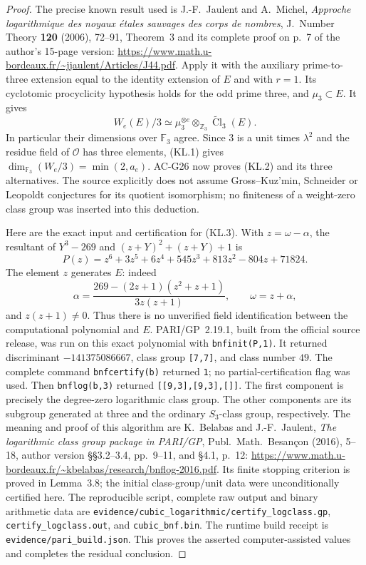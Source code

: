 \begin{proof}
The precise known result used is J.-F.~Jaulent and A.~Michel,
\emph{Approche logarithmique des noyaux \'etales sauvages des corps
 de nombres}, J.~Number Theory \textbf{120} (2006), 72--91,
Theorem~3 and its complete proof on p.~7 of the author's 15-page
version:
\url{https://www.math.u-bordeaux.fr/~jjaulent/Articles/J44.pdf}.
Apply it with the auxiliary prime-to-three extension equal to the
identity extension of $E$ and with $r=1$.  Its cyclotomic
procyclicity hypothesis holds for the odd prime three, and
$\mu_3\subset E$.  It gives
\[
 W_e(E)/3\simeq\mu_3^{\otimes e}\otimes_{\mathbb Z_3}
                   \widetilde{\operatorname{Cl}}_3(E). \tag{KL.4}
\]
In particular their dimensions over $\mathbb F_3$ agree.
Since $3$ is a unit times $\lambda^2$ and the residue field of
$\mathcal O$ has three elements, (KL.1) gives
$\dim_{\mathbb F_3}(W_e/3)=\min(2,a_e)$.  AC-G26 now proves
(KL.2) and its three alternatives.  The source explicitly does
not assume Gross--Kuz'min, Schneider or Leopoldt conjectures
for its quotient isomorphism; no finiteness of a weight-zero
class group was inserted into this deduction.

Here are the exact input and certification for (KL.3).  With
$z=\omega-\alpha$, the resultant of
$Y^3-269$ and $(z+Y)^2+(z+Y)+1$ is
\[
 P(z)=z^6+3z^5+6z^4+545z^3+813z^2-804z+71824.
                                                               \tag{KL.5}
\]
The element $z$ generates $E$: indeed
\[
 \alpha=\frac{269-(2z+1)(z^2+z+1)}{3z(z+1)},
 \qquad \omega=z+\alpha,
\]
and $z(z+1)\ne0$.  Thus there is no unverified field
identification between the computational polynomial and $E$.
PARI/GP~2.19.1, built from the official source release, was run
on this exact polynomial with \texttt{bnfinit(P,1)}.
It returned discriminant $-141375086667$, class group
\texttt{[7,7]}, and class number $49$.
The complete command \texttt{bnfcertify(b)} returned \texttt{1};
no partial-certification flag was used.  Then
\texttt{bnflog(b,3)} returned
\texttt{[[9,3],[9,3],[]]}.
The first component is precisely the degree-zero logarithmic
class group.  The other components are its subgroup generated
at three and the ordinary $S_3$-class group, respectively.
The meaning and proof of this algorithm are K.~Belabas and
J.-F.~Jaulent, \emph{The logarithmic class group package in
PARI/GP}, Publ.~Math.~Besan\c con (2016), 5--18,
author version \S\S3.2--3.4, pp.~9--11, and \S4.1, p.~12:
\url{https://www.math.u-bordeaux.fr/~kbelabas/research/bnflog-2016.pdf}.
Its finite stopping criterion is proved in Lemma~3.8; the
initial class-group/unit data were unconditionally certified
here.  The reproducible script, complete raw output and binary
arithmetic data are
\texttt{evidence/cubic\_logarithmic/certify\_logclass.gp},
\texttt{certify\_logclass.out}, and
\texttt{cubic\_bnf.bin}.  The runtime build receipt is
\texttt{evidence/pari\_build.json}.  This proves the asserted
computer-assisted values and completes the residual conclusion.
\end{proof}

